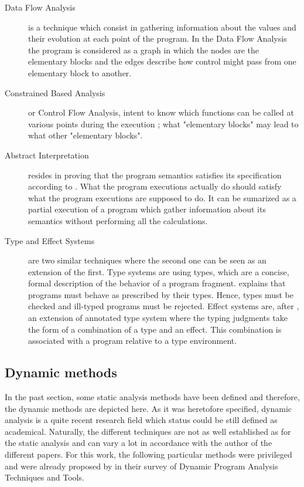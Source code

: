 \begin{description}
  \item[Data Flow Analysis] is a technique which consist in gathering information about the values and their evolution at each point of the program. In the Data Flow Analysis the program is considered as a graph in which the nodes are the elementary blocks and the edges describe how control might pass from one elementary block to another.
  
  \item[Constrained Based Analysis] or Control Flow Analysis, intent to know which functions can be called at various points during the execution ; what "elementary blocks" may lead to what other "elementary blocks".
  
  \item[Abstract Interpretation] resides in proving that the program semantics satisfies its specification according to \cite{Cousot2008}. What the program executions actually do should satisfy what the program executions are supposed to do. It can be sumarized as a partial execution of a program which gather information about its semantics without performing all the calculations.
  
  \item[Type and Effect Systems] are two similar techniques where the second one can be seen as an extension of the first. Type systems are using types, which are a concise, formal description of the behavior of a program fragment. \cite{Remy2017} explains that programs must behave as prescribed by their types. Hence, types must be checked and ill-typed programs must be rejected. Effect systems are, after \cite{Nielson1999}, an extension of annotated type system where the typing judgments take the form of a combination of a type and an effect. This combination is associated with a program relative to a type environment.
\end{description}


\subsection{Dynamic methods}

In the past section, some static analysis methods have been defined and therefore, the dynamic methods are depicted here. As it was heretofore specified, dynamic analysis is a quite recent research field which status could be still defined as academical. Naturally, the different techniques are not as well established as for the static analysis and can vary a lot in accordance with the author of the different papers. For this work, the following particular methods were privileged and were already proposed by \cite{Gosain2015} in their survey of Dynamic Program Analysis Techniques and Tools. 

